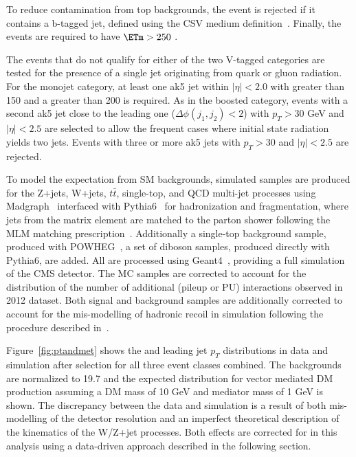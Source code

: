 To reduce contamination from top backgrounds, the event is rejected if it contains a 
b-tagged jet, defined using the CSV medium definition~\cite{BTAG}. Finally, the events are required to 
have $\ETm>250$ \gev. 

The events that do not qualify for either of the two V-tagged categories are tested for the presence of a single jet originating from quark or gluon radiation. 
For the monojet category, at least one ak5 jet within $|\eta|<2.0$ with \pt greater 
than 150 \gev and a \ETm greater than 200 \gev is required.  
As in the boosted category, events with a second ak5 jet close to the leading one ($\Delta\phi(j_1,j_2) < 2$) 
with $p_T>30$ GeV and $|\eta|<2.5$ are selected to allow the frequent cases where initial state radiation yields two jets.
Events with three or more ak5 jets with $p_T>30$ \gev and $|\eta|<2.5$ are rejected.

To model the expectation from SM backgrounds, simulated samples are produced for the
Z+jets, W+jets, $t\bar{t}$, single-top, and QCD multi-jet processes
using Madgraph~\cite{amcatnlo} interfaced with Pythia6~\cite{Sjostrand:2006za} for hadronization and
fragmentation, where jets from the matrix element are matched to the parton shower following the MLM matching prescription~\cite{Mangano:2006rw}.
Additionally a single-top background sample, produced with
POWHEG~\cite{powheg},  a set of diboson samples, produced directly
with Pythia6, are added. All are processed using Geant4~\cite{geant4}, providing a full simulation of the CMS detector.
The MC samples are corrected to account for the distribution of the number of additional (pileup or PU) interactions
observed in 2012 dataset. Both signal and background samples are additionally corrected to account for the mis-modelling of hadronic recoil in simulation following
the procedure described in~\cite{CMS-PAS-JME-12-002}.


Figure~\ref{fig:ptandmet} shows the \ETm and leading jet $p_{T}$ distributions in data and 
simulation after selection for all three event classes combined. The backgrounds are normalized to 19.7\fbinv 
and the expected distribution for vector mediated DM production assuming a DM mass of 10 GeV and mediator mass of 1 GeV is shown. 
The discrepancy between the data and simulation is a result of both mis-modelling of the 
detector resolution and an imperfect theoretical description of the kinematics of the W/Z+jet processes. 
Both effects are corrected for in this analysis using a data-driven approach described in the following section. 

